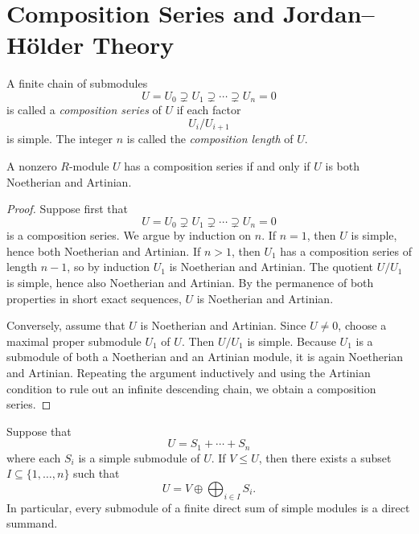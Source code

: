 \section{Composition Series and Jordan--H\"older Theory}

\begin{definition}
    A finite chain of submodules
    \[
        U=U_0\supsetneq U_1\supsetneq \cdots \supsetneq U_n=0
    \]
    is called a \emph{composition series} of $U$ if each factor
    \[
        U_i/U_{i+1}
    \]
    is simple. The integer $n$ is called the \emph{composition length} of $U$.
\end{definition}

\begin{lemma}
    A nonzero $R$-module $U$ has a composition series if and only if $U$ is both
    Noetherian and Artinian.
\end{lemma}

\begin{proof}
    Suppose first that
    \[
        U=U_0\supsetneq U_1\supsetneq \cdots \supsetneq U_n=0
    \]
    is a composition series. We argue by induction on $n$. If $n=1$, then $U$ is simple,
    hence both Noetherian and Artinian. If $n>1$, then $U_1$ has a composition series of
    length $n-1$, so by induction $U_1$ is Noetherian and Artinian. The quotient $U/U_1$ is simple, hence also Noetherian and Artinian. By the permanence of both
    properties in short exact sequences, $U$ is Noetherian and Artinian.

    Conversely, assume that $U$ is Noetherian and Artinian. Since $U\neq 0$, choose a
    maximal proper submodule $U_1$ of $U$. Then $U/U_1$ is simple. Because $U_1$ is a
    submodule of both a Noetherian and an Artinian module, it is again Noetherian and
    Artinian. Repeating the argument inductively and using the Artinian condition to rule
    out an infinite descending chain, we obtain a composition series.
\end{proof}

\begin{lemma}
    Suppose that
    \[
        U=S_1+\cdots+S_n
    \]
    where each $S_i$ is a simple submodule of $U$. If $V\leq U$, then there exists a
    subset $I\subseteq \{1,\dots,n\}$ such that
    \[
        U=V\oplus \bigoplus_{i\in I} S_i.
    \]
    In particular, every submodule of a finite direct sum of simple modules is a direct
    summand.
\end{lemma}

